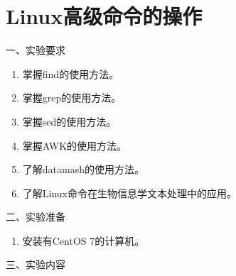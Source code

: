 \chapter{Linux高级命令的操作}

\noindent
一、实验要求
\begin{enumerate}
  \item 掌握find的使用方法。
  \item 掌握grep的使用方法。
  \item 掌握sed的使用方法。
  \item 掌握AWK的使用方法。
  \item 了解datamash的使用方法。
  \item 了解Linux命令在生物信息学文本处理中的应用。
\end{enumerate}

\vspace{0.2in}
\noindent
二、实验准备
\begin{enumerate}
  \item 安装有CentOS 7的计算机。
\end{enumerate}

\vspace{0.2in}
\noindent
三、实验内容

